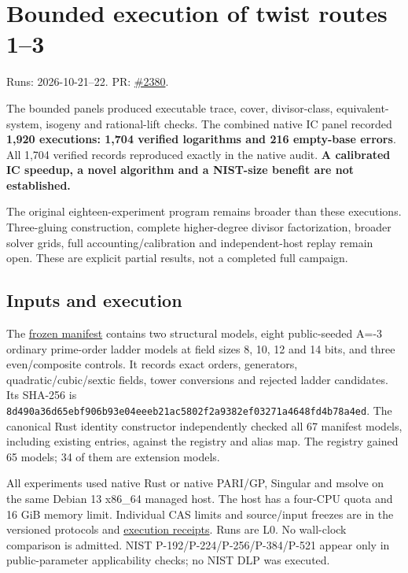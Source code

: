 \documentclass[
  10pt,
]{article}
\author{}
\date{}
\begin{document}
\section{Bounded execution of twist routes
1--3}\label{bounded-execution-of-twist-routes-13}

Runs: 2026-10-21--22. PR:
\href{https://github.com/aburan28/crypto/pull/2380}{\#2380}.

The bounded panels produced executable trace, cover, divisor-class,
equivalent-system, isogeny and rational-lift checks. The combined native
IC panel recorded \textbf{1,920 executions: 1,704 verified logarithms
and 216 empty-base errors}. All 1,704 verified records reproduced
exactly in the native audit. \textbf{A calibrated IC speedup, a novel
algorithm and a NIST-size benefit are not established.}

The original eighteen-experiment program remains broader than these
executions. Three-gluing construction, complete higher-degree divisor
factorization, broader solver grids, full accounting/calibration and
independent-host replay remain open. These are explicit partial results,
not a completed full campaign.

\subsection{Inputs and execution}\label{inputs-and-execution}

The \href{../execution-v1/fixtures.json}{frozen manifest} contains two
structural models, eight public-seeded A=-3 ordinary prime-order ladder
models at field sizes 8, 10, 12 and 14 bits, and three even/composite
controls. It records exact orders, generators, quadratic/cubic/sextic
fields, tower conversions and rejected ladder candidates. Its SHA-256 is
\texttt{8d490a36d65ebf906b93e04eeeb21ac5802f2a9382ef03271a4648fd4b78a4ed}.
The canonical Rust identity constructor independently checked all 67
manifest models, including existing entries, against the registry and
alias map. The registry gained 65 models; 34 of them are extension
models.

All experiments used native Rust or native PARI/GP, Singular and msolve
on the same Debian 13 x86\_64 managed host. The host has a four-CPU
quota and 16 GiB memory limit. Individual CAS limits and source/input
freezes are in the versioned protocols and
\href{../execution-v1/}{execution receipts}. Runs are L0. No wall-clock
comparison is admitted. NIST P-192/P-224/P-256/P-384/P-521 appear only
in public-parameter applicability checks; no NIST DLP was executed.
\end{document}
